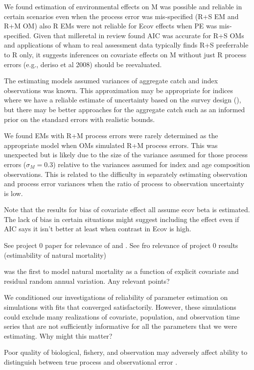 \documentclass[
  12pt,
]{article}
\begin{document}
We found estimation of environmental effects on M was possible and reliable in certain scenarios even when the process error was mis-specified (R+S EM and R+M OM) also R EMs were not reliable for Ecov effects when PE was mis-specified. Given that milleretal in review found AIC was accurate for R+S OMs and applications of wham to real assessment data typically finds R+S preferrable to R only, it suggests inferences on covariate effects on M without just R process errors (e.g., deriso et al 2008) should be reevaluated.

The estimating models assumed variances of aggregate catch and index observations was known. This approximation may be appropriate for indices where we have a reliable estimate of uncertainty based on the survey design (), but there may be better approaches for the aggregate catch such as an informed prior on the standard errors with realistic bounds.

We found EMs with R+M process errors were rarely determined as the appropriate model when OMs simulated R+M process errors. This was unexpected but is likely due to the size of the variance assumed for those process errors (\(\sigma_M = 0.3\)) relative to the variances assumed for index and age composition observations. This is related to the difficulty in separately estimating observation and process error variances when the ratio of process to observation uncertainty is low.

Note that the results for bias of covariate effect all assume ecov beta is estimated. The lack of bias in certain situations might suggest including the effect even if AIC says it isn't better at least when contrast in Ecov is high.

See project 0 paper for relevance of \citet{lietal24} and \citet{liljestrandetal24}. See \citet{milleretal_inreview1} fro relevance of project 0 results (estimability of natural mortality)

\citet{derisoetal08} was the first to model natural mortality as a function of explicit covariate and residual random annual variation. Any relevant points?

We conditioned our investigations of reliability of parameter estimation on simulations with fits that converged satisfactorily. However, these simulations could exclude many realizations of covariate, population, and observation time series that are not sufficiently informative for all the parameters that we were estimating. Why might this matter?

Poor quality of biological, fishery, and observation may adversely affect ability to distinguish between true process and observational error \citep{puntetal14, stewartmonnahan17, croninpunt21, fischetal23, lietal_inreview_a}.
\end{document}
